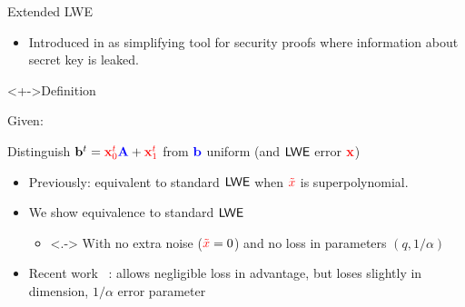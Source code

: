 \begin{frame}{Extended LWE}
  \begin{itemize}
  \item<+-> Introduced in  as
    simplifying tool for security proofs where information about
    secret key is leaked.
  \end{itemize}
  \begin{block}<+->{Definition}
    
    Given: \\
    \medskip
    
    Distinguish
    $\mathbf{b}^t={\color{red} \mathbf{x}_0^{t}}{\color{blue} \mathbf{A}}+{\color{red} \mathbf{x}_1^{t}}$ from
    ${\color{blue} \mathbf{b}}$ uniform
    (and $\textsf{LWE}$ error ${\color{red} \mathbf{x}}$)\\
  \end{block}
  \begin{itemize}
  \item<+-> Previously: equivalent to standard $\textsf{LWE}$ when
    ${\color{red} \tilde{x}}$ is superpolynomial.
  \item<+-> We show equivalence to standard $\textsf{LWE}$
    \begin{itemize}
    \item<.-> With \alert{no extra noise} (${\color{red} \tilde{x}}=0$) and
      \alert{no loss in parameters} $(q, 1/\alpha)$
    \end{itemize}
 \item<+-> Recent work ~: allows negligible loss
   in advantage, but loses slightly in dimension, $1/\alpha$ error parameter
  \end{itemize}
\end{frame}



